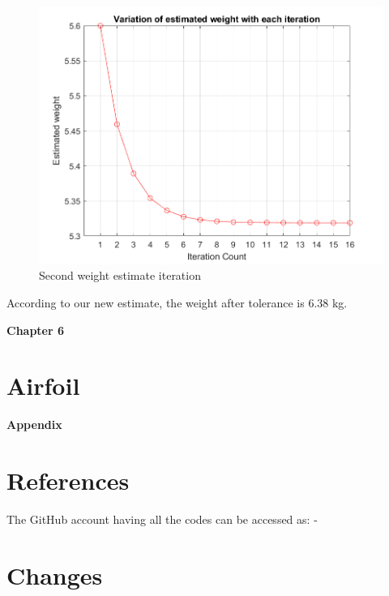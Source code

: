 \documentclass[12 pt]{article}
\begin{document}
\begin{figure}[h]
    \centering
    \includegraphics[width=1.0\linewidth]{Codes//Week 2/weight_2.png}
    \caption{Second weight estimate iteration}
    \label{Second weight estimate iteration}
\end{figure}

According to our new estimate, the weight after tolerance is 6.38 kg.

\afterpage{\clearpage}
\newpage

\textbf{\Huge{Chapter 6}}
\section{Airfoil}

\newpage
\textbf{\Huge{Appendix}}
\appendix


\section{References}




\vspace{10 pt}

The GitHub account having all the codes can be accessed as: - 

\href{https://github.com/abhijeetmangela/Group_7_design.git}{}

\newpage

\section{Changes}
\end{document}
